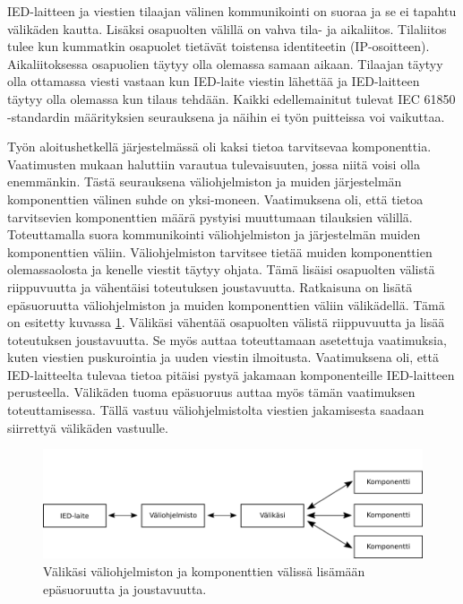 IED-laitteen ja viestien tilaajan välinen kommunikointi on suoraa ja se ei tapahtu välikäden kautta. Lisäksi osapuolten välillä on vahva tila- ja aikaliitos. Tilaliitos tulee kun kummatkin osapuolet tietävät toistensa identiteetin (IP-osoitteen). Aikaliitoksessa osapuolien täytyy olla olemassa samaan aikaan. Tilaajan täytyy olla ottamassa viesti vastaan kun IED-laite viestin lähettää ja IED-laitteen täytyy olla olemassa kun tilaus tehdään. Kaikki edellemainitut tulevat IEC 61850 -standardin määrityksien seurauksena ja näihin ei työn puitteissa voi vaikuttaa.

Työn aloitushetkellä järjestelmässä oli kaksi tietoa tarvitsevaa komponenttia. Vaatimusten mukaan haluttiin varautua tulevaisuuten, jossa niitä voisi olla enemmänkin. Tästä seurauksena väliohjelmiston ja muiden järjestelmän komponenttien välinen suhde on yksi-moneen. Vaatimuksena oli, että tietoa tarvitsevien komponenttien määrä pystyisi muuttumaan tilauksien välillä. Toteuttamalla suora kommunikointi väliohjelmiston ja järjestelmän muiden komponenttien väliin. Väliohjelmiston tarvitsee tietää muiden komponenttien olemassaolosta ja kenelle viestit täytyy ohjata. Tämä lisäisi osapuolten välistä riippuvuutta ja vähentäisi toteutuksen joustavuutta. Ratkaisuna on lisätä epäsuoruutta väliohjelmiston ja muiden komponenttien väliin välikädellä. Tämä on esitetty kuvassa \ref{fig:coupling-analysis}. Välikäsi vähentää osapuolten välistä riippuvuutta ja lisää toteutuksen joustavuutta. Se myös auttaa toteuttamaan asetettuja vaatimuksia, kuten viestien puskurointia ja uuden viestin ilmoitusta. Vaatimuksena oli, että IED-laitteelta tulevaa tietoa pitäisi pystyä jakamaan komponenteille IED-laitteen perusteella. Välikäden tuoma epäsuoruus auttaa myös tämän vaatimuksen toteuttamisessa. Tällä vastuu väliohjelmistolta viestien jakamisesta saadaan siirrettyä välikäden vastuulle.

\begin{figure}[ht!]
	\includegraphics[width=1\textwidth]{pictures/coupling-analysis.png}
	\caption{Välikäsi väliohjelmiston ja komponenttien välissä lisämään epäsuoruutta ja joustavuutta.}
	\label{fig:coupling-analysis}
\end{figure}

